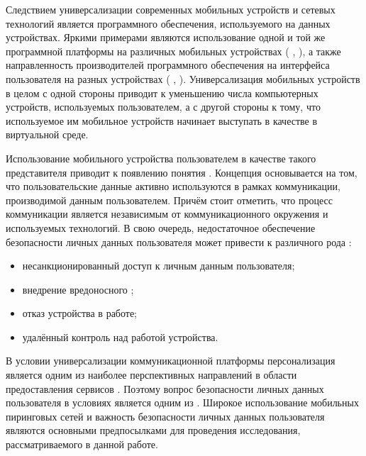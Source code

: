 %
Следствием универсализации современных мобильных устройств и сетевых технологий является  программного обеспечения, используемого на данных устройствах.
%
Яркими примерами являются использование одной и той же программной платформы на различных мобильных устройствах ( ,  ), а также направленность производителей программного обеспечения на  интерфейса пользователя на разных устройствах ( ,  ).
%
Универсализация мобильных устройств в целом с одной стороны приводит к уменьшению числа компьютерных устройств, используемых пользователем, а с другой стороны к тому, что используемое им мобильное устройств начинает выступать в качестве  в виртуальной среде.

%
Использование мобильного устройства пользователем в качестве такого представителя приводит к появлению понятия  .
%
Концепция  основывается на том, что пользовательские данные активно используются в рамках коммуникации, производимой данным пользователем.
%
Причём стоит отметить, что процесс коммуникации является независимым от коммуникационного окружения и используемых технологий.
%
В свою очередь, недостаточное обеспечение безопасности личных данных пользователя может привести к различного рода  :
\begin{itemize}
	\item несанкционированный доступ к личным данным пользователя;
	\item внедрение вредоносного ;
	\item отказ устройства в работе;
	\item удалённый контроль над работой устройства.
\end{itemize}

%
В условии универсализации коммуникационной платформы персонализация является одним из наиболее перспективных направлений в области предоставления сервисов .
%
Поэтому вопрос безопасности личных данных пользователя в условиях является одним из .
%
Широкое использование мобильных пиринговых сетей и важность безопасности личных данных пользователя являются основными предпосылками для проведения исследования, рассматриваемого в данной работе.